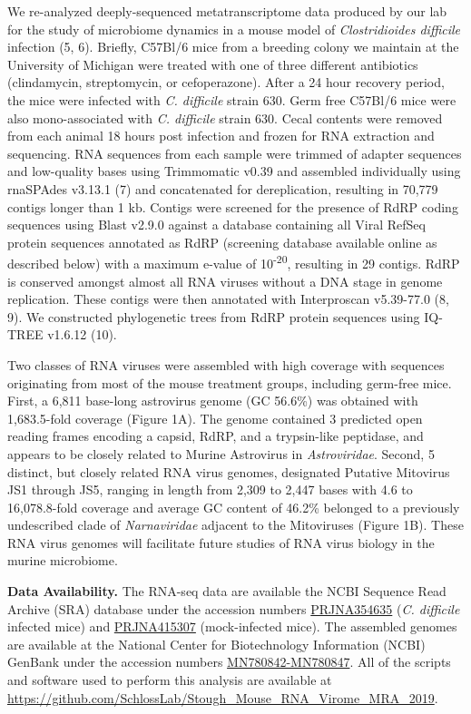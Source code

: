 \documentclass[11pt,]{article}
\begin{document}
We re-analyzed deeply-sequenced metatranscriptome data produced by our
lab for the study of microbiome dynamics in a mouse model of
\emph{Clostridioides difficile} infection (5, 6). Briefly, C57Bl/6 mice
from a breeding colony we maintain at the University of Michigan were
treated with one of three different antibiotics (clindamycin,
streptomycin, or cefoperazone). After a 24 hour recovery period, the
mice were infected with \emph{C. difficile} strain 630. Germ free
C57Bl/6 mice were also mono-associated with \emph{C. difficile} strain
630. Cecal contents were removed from each animal 18 hours post
infection and frozen for RNA extraction and sequencing. RNA sequences
from each sample were trimmed of adapter sequences and low-quality bases
using Trimmomatic v0.39 and assembled individually using rnaSPAdes
v3.13.1 (7) and concatenated for dereplication, resulting in 70,779
contigs longer than 1 kb. Contigs were screened for the presence of RdRP
coding sequences using Blast v2.9.0 against a database containing all
Viral RefSeq protein sequences annotated as RdRP (screening database
available online as described below) with a maximum e-value of
10\textsuperscript{-20}, resulting in 29 contigs. RdRP is conserved
amongst almost all RNA viruses without a DNA stage in genome
replication. These contigs were then annotated with Interproscan
v5.39-77.0 (8, 9). We constructed phylogenetic trees from RdRP protein
sequences using IQ-TREE v1.6.12 (10).

Two classes of RNA viruses were assembled with high coverage with
sequences originating from most of the mouse treatment groups, including
germ-free mice. First, a 6,811 base-long astrovirus genome (GC 56.6\%)
was obtained with 1,683.5-fold coverage (Figure 1A). The genome
contained 3 predicted open reading frames encoding a capsid, RdRP, and a
trypsin-like peptidase, and appears to be closely related to Murine
Astrovirus in \emph{Astroviridae}. Second, 5 distinct, but closely
related RNA virus genomes, designated Putative Mitovirus JS1 through
JS5, ranging in length from 2,309 to 2,447 bases with 4.6 to
16,078.8-fold coverage and average GC content of 46.2\% belonged to a
previously undescribed clade of \emph{Narnaviridae} adjacent to the
Mitoviruses (Figure 1B). These RNA virus genomes will facilitate future
studies of RNA virus biology in the murine microbiome.

\textbf{Data Availability.} The RNA-seq data are available the NCBI
Sequence Read Archive (SRA) database under the accession numbers
\href{https://www.ncbi.nlm.nih.gov/bioproject/354635}{PRJNA354635}
(\emph{C. difficile} infected mice) and
\href{https://www.ncbi.nlm.nih.gov/bioproject/415307}{PRJNA415307}
(mock-infected mice). The assembled genomes are available at the
National Center for Biotechnology Information (NCBI) GenBank under the
accession numbers
\href{https://www.ncbi.nlm.nih.gov/nuccore/?term=MN780842+MN780843+MN780844+MN780845+MN780846+MN780847}{MN780842-MN780847}.
All of the scripts and software used to perform this analysis are
available at
\url{https://github.com/SchlossLab/Stough_Mouse_RNA_Virome_MRA_2019}.
\end{document}
